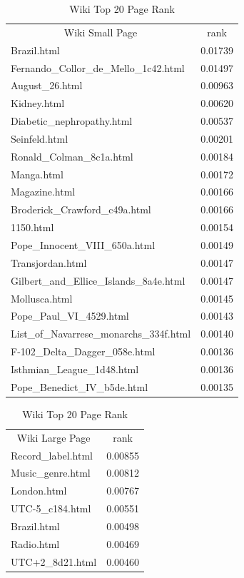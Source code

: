 \documentclass[11pt]{article}
\begin{document}
\begin{table}[H]
\centering
\caption{Wiki Top 20 Page Rank}
\label{tb:wpr} 
\begin{minipage}{.5\textwidth}
\begin{tabular}{lc|}
\multicolumn{1}{c}{Wiki Small Page} & \multicolumn{1}{c|}{rank} \\
Brazil.html & 0.01739 \\
Fernando\_Collor\_de\_Mello\_1c42.html & 0.01497 \\
August\_26.html & 0.00963 \\
Kidney.html & 0.00620 \\
Diabetic\_nephropathy.html & 0.00537 \\
Seinfeld.html & 0.00201 \\
Ronald\_Colman\_8c1a.html & 0.00184 \\
Manga.html & 0.00172 \\
Magazine.html & 0.00166 \\
Broderick\_Crawford\_c49a.html & 0.00166 \\
1150.html & 0.00154 \\
Pope\_Innocent\_VIII\_650a.html & 0.00149 \\
Transjordan.html & 0.00147 \\
Gilbert\_and\_Ellice\_Islands\_8a4e.html & 0.00147 \\
Mollusca.html & 0.00145 \\
Pope\_Paul\_VI\_4529.html & 0.00143 \\
List\_of\_Navarrese\_monarchs\_334f.html & 0.00140 \\
F-102\_Delta\_Dagger\_058e.html & 0.00136 \\
Isthmian\_League\_1d48.html & 0.00136 \\
Pope\_Benedict\_IV\_b5de.html & 0.00135
\end{tabular}
 \end{minipage}%
    \begin{minipage}{0.5\textwidth}
    \begin{tabular}{lc}
\multicolumn{1}{c}{Wiki Large Page} & rank \\
Record\_label.html & 0.00855 \\
Music\_genre.html & 0.00812 \\
London.html & 0.00767 \\
UTC-5\_c184.html & 0.00551 \\
Brazil.html & 0.00498 \\
Radio.html & 0.00469 \\
UTC+2\_8d21.html & 0.00460 \\

\end{tabular}
\end{minipage}
\end{table}
\end{document}
